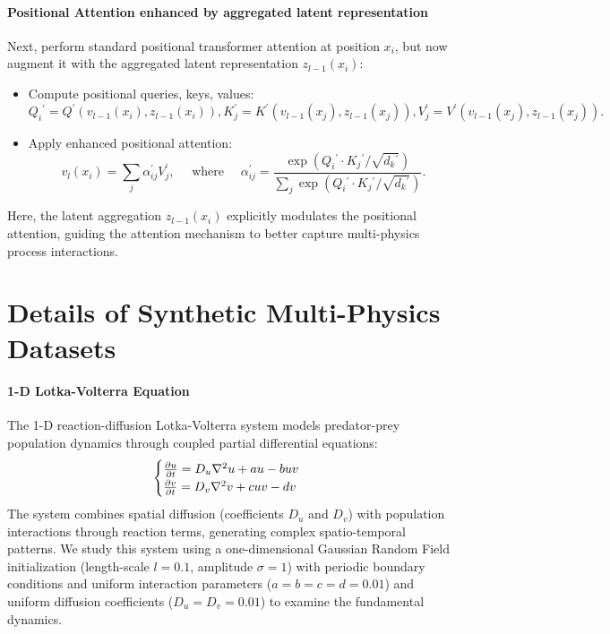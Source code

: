 \paragraph{Positional Attention enhanced by aggregated latent representation} Next, perform standard positional transformer attention at position $x_i$, but now augment it with the aggregated latent representation $z_{l-1}\left(x_i\right)$:
\begin{itemize}
	\item Compute positional queries, keys, values:
	\[
		Q_i{ }^{\prime}=Q^{\prime}\left(v_{l-1}\left(x_i\right), z_{l-1}\left(x_i\right)\right), K_j^{\prime}=K^{\prime}\left(v_{l-1}\left(x_j\right), z_{l-1}\left(x_j\right)\right), V_j^{\prime}=V^{\prime}\left(v_{l-1}\left(x_j\right), z_{l-1}\left(x_j\right)\right) .
	\]
	\item Apply enhanced positional attention:
	\[
		v_l\left(x_i\right)=\sum_j \alpha^{\prime}_{ij} V_j^{\prime}, \quad \text { where } \quad \alpha^{\prime}_{ij}=\frac{\exp \left(Q_i{ }^{\prime} \cdot K_j{ }^{\prime} / \sqrt{d_k{ }^{\prime}}\right)}{\sum_j \exp \left(Q_i{ }^{\prime} \cdot K_j{ }^{\prime} / \sqrt{d_k{ }^{\prime}}\right)} .
	\]
\end{itemize}
Here, the latent aggregation $z_{l-1}\left(x_i\right)$ explicitly modulates the positional attention, guiding the attention mechanism to better capture multi-physics process interactions.

\newpage
\section{Details of Synthetic Multi-Physics Datasets}
\label{sec:appx-synt}

\paragraph{1-D Lotka-Volterra Equation}The 1-D reaction-diffusion Lotka-Volterra system models predator-prey population dynamics through coupled partial differential equations:
\begin{equation}
	\begin{cases}
		\frac{\partial u}{\partial t} = D_u\nabla^2 u + au - buv \notag \\
		\frac{\partial v}{\partial t} = D_v\nabla^2 v + cuv -dv \notag
	\end{cases}
\end{equation}
The system combines spatial diffusion (coefficients $D_u$ and $D_v$) with population interactions through reaction terms, generating complex spatio-temporal patterns. We study this system using a one-dimensional Gaussian Random Field initialization (length-scale $l=0.1$, amplitude $\sigma=1$) with periodic boundary conditions and uniform interaction parameters ($a=b=c=d=0.01$) and uniform diffusion coefficients ($D_u=D_v=0.01$) to examine the fundamental dynamics.

